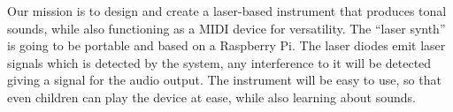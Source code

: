 Our mission is to design and create a laser-based instrument that produces tonal sounds, while also functioning as a MIDI device for versatility. The ``laser synth'' is going to be portable and based on a Raspberry Pi. The laser diodes emit laser signals which is detected by the system, any interference to it will be detected giving a signal for the audio output. The instrument will be easy to use, so that even children can play the device at ease, while also learning about sounds.
